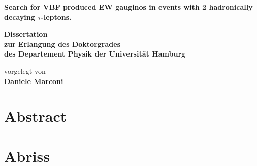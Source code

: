 \documentclass[
twoside=false,
headsepline,     %
headings=normal,
open=any,
numbers=noenddot, %
numbering %
]{scrreprt} %
\author{Daniele Marconi}
\begin{document}
\begin{titlepage}
  \begin{center}
    \thispagestyle{empty}
    \vspace*{1cm}
    \begin{doublespace} 
      \textbf{\huge
Search for VBF produced EW gauginos
in events with 2 hadronically decaying $\tau$-leptons.}
      \vskip2.5cm
      \begin{Large} 
        \textbf{Dissertation\\
          zur Erlangung des Doktorgrades\\
          des Departement Physik
          der Universit\"{a}t Hamburg\\}
      \end{Large}
      \vskip4cm
      \begin{large}
        vorgelegt von\\
        {\textbf{Daniele Marconi} }
        \vfill
      \end{large}
    \end{doublespace} 
  \end{center}
\end{titlepage}

\newpage
\thispagestyle{empty}

\quad
\vfill
{}

\newpage
\thispagestyle{empty}
\section*{Abstract}

\clearpage
\section*{Abriss}

\newpage 
\thispagestyle{empty}
\quad 
\newpage
\end{document}
